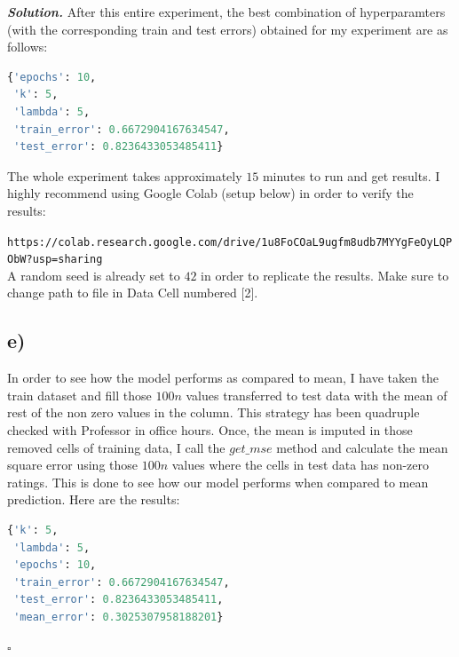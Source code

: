 \documentclass[10pt]{article}
\newenvironment{solution}[1][\it{Solution}]{\textbf{#1. } }{$\square$}
\begin{document}
\begin{solution}
After this entire experiment, the best combination of hyperparamters (with the corresponding train and test errors) obtained for my experiment are as follows:

\begin{lstlisting}[language=Python]
{'epochs': 10,
 'k': 5,
 'lambda': 5,
 'train_error': 0.6672904167634547,
 'test_error': 0.8236433053485411}
\end{lstlisting}


The whole experiment takes approximately $15$ minutes to run and get results. I highly recommend using Google Colab (setup below) in order to verify the results:

\texttt{https://colab.research.google.com/drive/1u8FoCOaL9ugfm8udb7MYYgFeOyLQPObW?usp=sharing}\\

A random seed is already set to $42$ in order to replicate the results. Make sure to change path to file in Data Cell numbered [2].\\

\subsection*{e)}

In order to see how the model performs as compared to mean, I have taken the train dataset and fill those $100n$ values transferred to test data with the mean of rest of the non zero values in the column. This strategy has been quadruple checked with Professor in office hours. Once, the mean is imputed in those removed cells of training data, I call the $get\_mse$ method and calculate the mean square error using those $100n$ values where the cells in test data has non-zero ratings. This is done to see how our model performs when compared to mean prediction. Here are the results:

\begin{lstlisting}[language=Python]
{'k': 5,
 'lambda': 5,
 'epochs': 10,
 'train_error': 0.6672904167634547,
 'test_error': 0.8236433053485411,
 'mean_error': 0.3025307958188201}
\end{lstlisting}


\end{solution}
\end{document}
